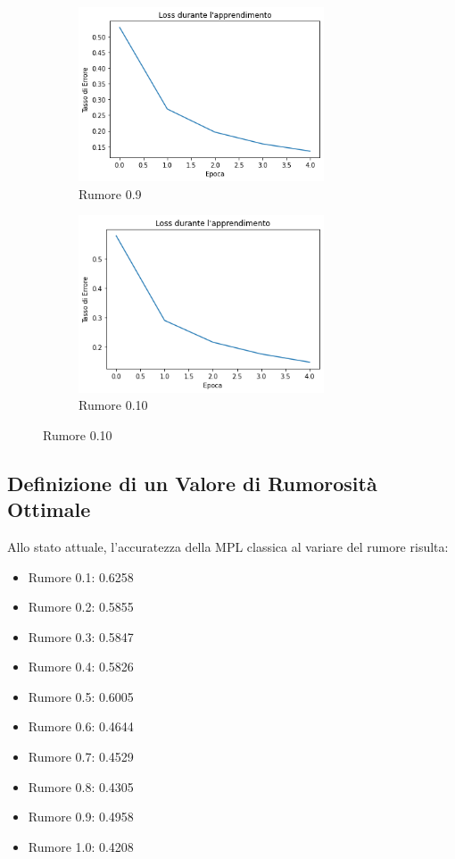 \documentclass[12pt, a4paper]{article}
\begin{document}
\begin{figure}[H]
    \begin{subfigure}{0.5\textwidth}
        \centering
        \caption{Rumore 0.9}
        \includegraphics[width=0.80\textwidth]{Rumore9.png}
    \end{subfigure}    
    \begin{subfigure}{0.5\textwidth}
        \centering
        \caption{Rumore 0.10}
        \includegraphics[width=0.80\textwidth]{Rumore10.png}
    \end{subfigure}       
\end{figure} 

\subsection{Definizione di un Valore di Rumorosità Ottimale}
Allo stato attuale, l'accuratezza della MPL classica al variare del rumore risulta:
\begin{itemize}
    \item Rumore 0.1: 0.6258
    \item Rumore 0.2: 0.5855
    \item Rumore 0.3: 0.5847
    \item Rumore 0.4: 0.5826
    \item Rumore 0.5: 0.6005
    \item Rumore 0.6: 0.4644
    \item Rumore 0.7: 0.4529
    \item Rumore 0.8: 0.4305
    \item Rumore 0.9: 0.4958
    \item Rumore 1.0: 0.4208
\end{itemize}
\end{document}
